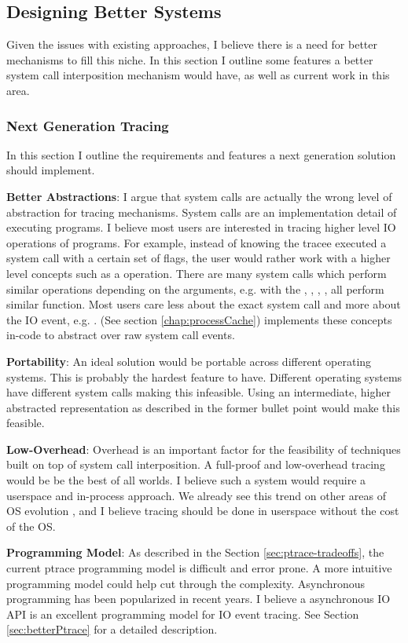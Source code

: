 \subsection{Designing Better Systems}
Given the issues with existing approaches, I believe there is a need for better mechanisms to fill this niche. In this section I outline some features a better system call interposition mechanism would have, as well as current work in this area.

\subsubsection{Next Generation Tracing}
In this section I outline the requirements and features a next generation solution should implement.
\begin{compactitem}
\item \textbf{Better Abstractions}: I argue that system calls are actually the wrong level of abstraction for tracing mechanisms. System calls are an implementation detail of executing programs. I believe most users are interested in tracing higher level IO operations of programs. For example, instead of knowing the tracee executed a  system call with a certain set of flags, the user would rather work with a higher level concepts such as a  operation. There are many system calls which perform similar operations depending on the arguments, e.g.  with the , , , , all perform similar function. Most users care less about the exact system call and more about the IO event, e.g. . \pc (See section \ref{chap:processCache}) implements these concepts in-code to abstract over raw system call events. 
\item \textbf{Portability}: An ideal solution would be portable across different operating systems. This is probably the hardest feature to have. Different operating systems have different system calls making this infeasible. Using an intermediate, higher abstracted representation as described in the former bullet point would make this feasible.
\item \textbf{Low-Overhead}: Overhead is an important factor for the feasibility of techniques built on top of system call interposition. A full-proof and low-overhead tracing would be be the best of all worlds. I believe such a system would require a userspace and in-process approach. We already see this trend on other areas of OS evolution \cite{demikernel}, and I believe tracing should be done in userspace without the cost of the OS.
\item \textbf{Programming Model}: As described in the Section \ref{sec:ptrace-tradeoffs}, the current ptrace programming model is difficult and error prone. A more intuitive programming model could help cut through the complexity. Asynchronous programming has been popularized in recent years. I believe a asynchronous IO API is an excellent programming model for IO event tracing. See Section \ref{sec:betterPtrace} for a detailed description.
\end{compactitem}

